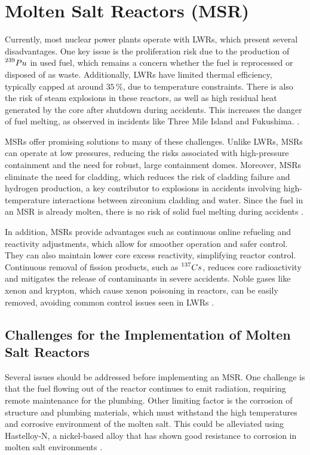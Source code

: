 \section{Molten Salt Reactors (MSR)}

Currently, most nuclear power plants operate with LWRs, which present several disadvantages. One key issue is the proliferation risk due to the production of \(\prescript{239}{}{Pu}\) in used fuel, which remains a concern whether the fuel is reprocessed or disposed of as waste. Additionally, LWRs have limited thermal efficiency, typically capped at around \(35\,\%\), due to temperature constraints. There is also the risk of steam explosions in these reactors, as well as high residual heat generated by the core after shutdown during accidents. This increases the danger of fuel melting, as observed in incidents like Three Mile Island and Fukushima. \cite{TMSR_book}.

MSRs offer promising solutions to many of these challenges. Unlike LWRs, MSRs can operate at low pressures, reducing the risks associated with high-pressure containment and the need for robust, large containment domes. Moreover, MSRs eliminate the need for cladding, which reduces the risk of cladding failure and hydrogen production, a key contributor to explosions in accidents involving high-temperature interactions between zirconium cladding and water. Since the fuel in an MSR is already molten, there is no risk of solid fuel melting during accidents \cite{TMSR_book}.

In addition, MSRs provide advantages such as continuous online refueling and reactivity adjustments, which allow for smoother operation and safer control. They can also maintain lower core excess reactivity, simplifying reactor control. Continuous removal of fission products, such as \(\prescript{137}{}{Cs}\), reduces core radioactivity and mitigates the release of contaminants in severe accidents. Noble gases like xenon and krypton, which cause xenon poisoning in reactors, can be easily removed, avoiding common control issues seen in LWRs \cite{TMSR_book}.

\subsection{Challenges for the Implementation of Molten Salt Reactors}

Several issues should be addressed before implementing an MSR. One challenge is that the fuel flowing out of the reactor continues to emit radiation, requiring remote maintenance for the plumbing. Other limiting factor is the corrosion of structure and plumbing materials, which must withstand the high temperatures and corrosive environment of the molten salt. This could be alleviated using Hastelloy-N, a nickel-based alloy that has shown good resistance to corrosion in molten salt environments \cite{TMSR_book,Haynes2024}.

